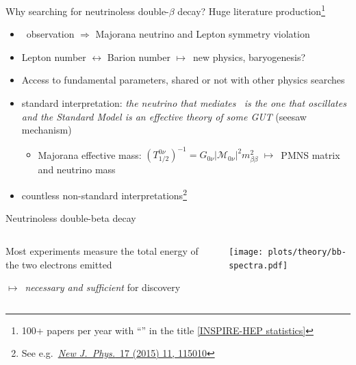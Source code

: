 \documentclass[10pt,aspectratio=169]{beamer}
\newcommand{\arrow}{$\longmapsto$}
\begin{document}
\begin{frame}{Why searching for neutrinoless double-$\beta$ decay?}
  Huge literature production\footnote{%
    100+ papers per year with ``\onbb'' in the title
    \href{https://inspirehep.net/literature?sort=mostrecent&size=25&page=1&q=find\%20t\%20\%CE\%B2\%CE\%B2\%20or\%20double-beta\%20or\%20double\%20beta\%20or\%20double\%20\%CE\%B2\%20or\%20double-\%CE\%B2\%20or\%200\%CE\%BD\%CE\%B2\%CE\%B2&ui-citation-summary=true}{[INSPIRE-HEP statistics]}
  }
  \begin{itemize}
    \item \onbb\ observation $\Rightarrow$ \alert{Majorana neutrino} and \alert{Lepton symmetry violation}
    \item Lepton number $\longleftrightarrow$ Barion number \arrow\
      \alert{new physics}, \alert{baryogenesis?}
    \item Access to fundamental parameters, shared or not with other
      physics searches
    \item \alert{standard interpretation}: \emph{the neutrino that mediates
      \onbb\ is the one that oscillates and the Standard Model is an effective
      theory of some GUT} (seesaw mechanism)
    \begin{itemize}
      \item Majorana effective mass:
        $(T^{0\nu}_{1/2})^{-1}=G_{0\nu} |\mathcal{M}_{0\nu}|^2 m_{\beta\beta}^2$
        \arrow\ PMNS matrix and neutrino mass
    \end{itemize}
  \item countless non-standard interpretations\footnote{See e.g.~\href{https://doi.org/10.1088/1367-2630/17/11/115010}{\emph{New J.~Phys.}~17 (2015) 11, 115010}}
  \end{itemize}
\end{frame}
\begin{frame}{Neutrinoless double-beta decay}
  \begin{columns}
    \begin{column}{0.5\textwidth}
      Most experiments measure the \alert{total energy of the two electrons
      emitted}

      \vspace*{16pt}
      \arrow\ \emph{necessary and sufficient} for discovery
    \end{column}
    \begin{column}{0.5\textwidth}
      \begin{center}
        \texttt{[image: plots/theory/bb-spectra.pdf]}
      \end{center}
    \end{column}
  \end{columns}
\end{frame}
\end{document}
